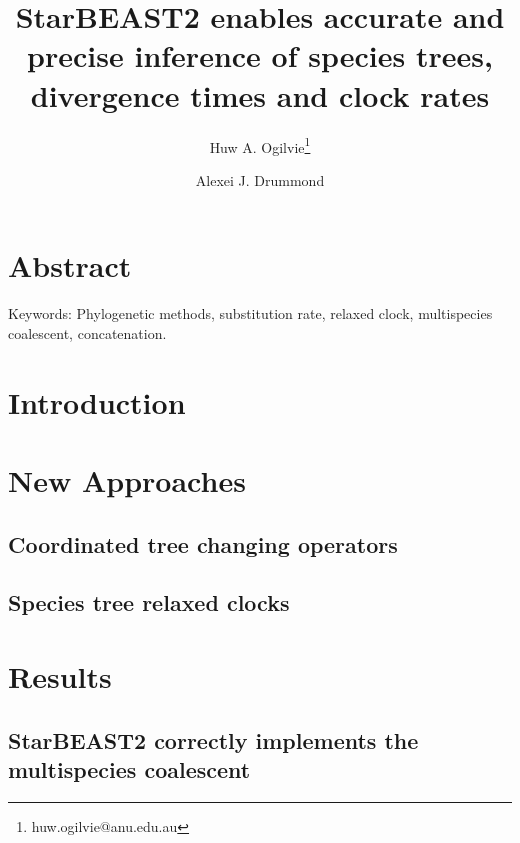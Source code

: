 \documentclass[12pt]{article}
\begin{document}
\title{StarBEAST2 enables accurate and precise inference of species trees, divergence times and clock rates}
\author[1,2]{Huw A. Ogilvie\thanks{huw.ogilvie@anu.edu.au}}
\author[2,3]{Alexei J. Drummond}

\maketitle

\clearpage

\justifying

\section{Abstract}

Keywords: Phylogenetic methods, substitution rate, relaxed clock, multispecies coalescent, concatenation.

\section{Introduction}


\section{New Approaches}

\subsection{Coordinated tree changing operators}

\subsection{Species tree relaxed clocks}

\section{Results}

\subsection{StarBEAST2 correctly implements the multispecies coalescent}
\end{document}
